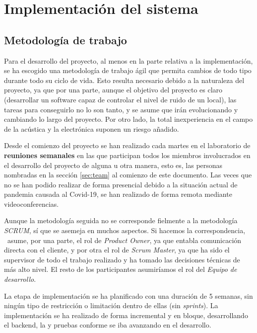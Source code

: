 \chapter{Implementación del sistema} \label{cap:capitulo6}

\section{Metodología de trabajo}

Para el desarrollo del proyecto, al menos en la parte relativa a la implementación, se ha escogido una metodología de trabajo ágil que permita cambios de todo tipo durante todo su ciclo de vida. Esto resulta necesario debido a la naturaleza del proyecto, ya que por una parte, aunque el objetivo del proyecto es claro (desarrollar un software capaz de controlar el nivel de ruido de un local), las tareas para conseguirlo no lo son tanto, y se asume que irán  evolucionando y cambiando lo largo del proyecto. Por otro lado, la total inexperiencia en el campo de la acústica y la electrónica suponen un riesgo añadido.

Desde el comienzo del proyecto se han realizado cada martes en el laboratorio de  \textbf{reuniones semanales} en las que participan todos los miembros involucrados en el desarrollo del proyecto de alguna u otra manera, esto es, las personas nombradas en la sección \ref{sec:team} al comienzo de este documento. Las veces que no se han podido realizar de forma presencial debido a la situación actual de pandemia causada al Covid-19, se han realizado de forma remota mediante videoconferencias.

Aunque la metodología seguida no se corresponde fielmente a la metodología \textit{SCRUM}, sí que se asemeja en muchos aspectos. Si hacemos la correspondencia, \myProf\ asume, por una parte, el rol de \textit{Product Owner}, ya que entabla comunicación directa con el cliente, y por otra el rol de \textit{Scrum Master}, ya que ha sido el supervisor de todo el trabajo realizado y ha tomado las decisiones técnicas de más alto nivel. El resto de los participantes asumiríamos el rol del \textit{Equipo de desarrollo}.

La etapa de implementación se ha planificado con una duración de 5 semanas, sin ningún tipo de restricción o limitación dentro de ellas (sin \textit{sprints}). La implementación se ha realizado de forma incremental y en bloque, desarrollando el backend, la  y pruebas conforme se iba avanzando en el desarrollo.

